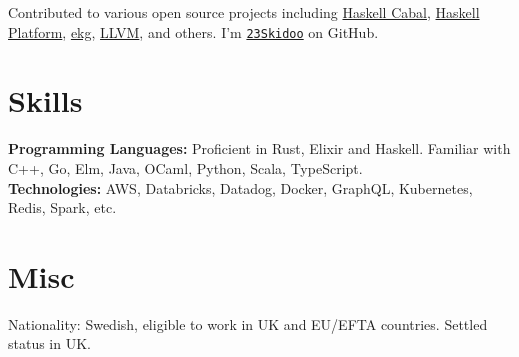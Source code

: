\documentclass[margin,line]{res}
\begin{document}
\begin{resume}
      Contributed to various open source projects including
      \href{https://github.com/haskell/cabal/}{Haskell Cabal}, \href{https://www.haskell.org/platform/}{Haskell Platform},
      \href{https://hackage.haskell.org/package/ekg}{ekg}, \href{https://llvm.org/}{LLVM}, and others.
      I'm \href{https://github.com/23Skidoo/}{\tt 23Skidoo} on GitHub.

      \section{\sc Skills}

       {\bf Programming Languages:} Proficient in Rust, Elixir and Haskell. Familiar
      with C++, Go, Elm, Java, OCaml, Python, Scala, TypeScript.\\
      {\bf Technologies:} AWS, Databricks, Datadog, Docker, GraphQL, Kubernetes,
      Redis, Spark, etc.

      \section{\sc Misc}

      Nationality: Swedish, eligible to work in UK and EU/EFTA countries. Settled status in UK.

\end{resume}
\end{document}
